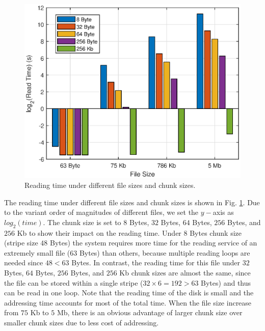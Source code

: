\documentclass[journal]{IEEEtran}
\begin{document}
\begin{figure}[htbp]
  \centering
  \includegraphics[width=0.9\linewidth]{Images/ReadTime.eps}
  \caption{Reading time under different file sizes and chunk sizes.}
  \label{fig:ReadTime}
\end{figure}
The reading time under different file sizes and chunk sizes is shown in Fig. \ref{fig:ReadTime}. Due to the variant order of magnitudes of different files, we set the $y-$axis as $log_2(time)$. The chunk size is set to $8$ Bytes, $32$ Bytes, $64$ Bytes, $256$ Bytes, and $256$ Kb to show their impact on the reading time. Under $8$ Bytes chunk size (stripe size $48$ Bytes) the system requires more time for the reading service of an extremely small file ($63$ Bytes) than others, because multiple reading loops are needed since $48 < 63$ Bytes. In contrast, the reading time for this file under $32$ Bytes, $64$ Bytes, $256$ Bytes, and $256$ Kb chunk sizes are almost the same, since the file can be stored within a single stripe ($32 \times 6 = 192 > 63$ Bytes) and thus can be read in one loop. Note that the reading time of the disk is small and the addressing time accounts for most of the total time.
When the file size increase from $75$ Kb to $5$ Mb, there is an obvious advantage of larger chunk size over smaller chunk sizes due to less cost of addressing.
\end{document}
